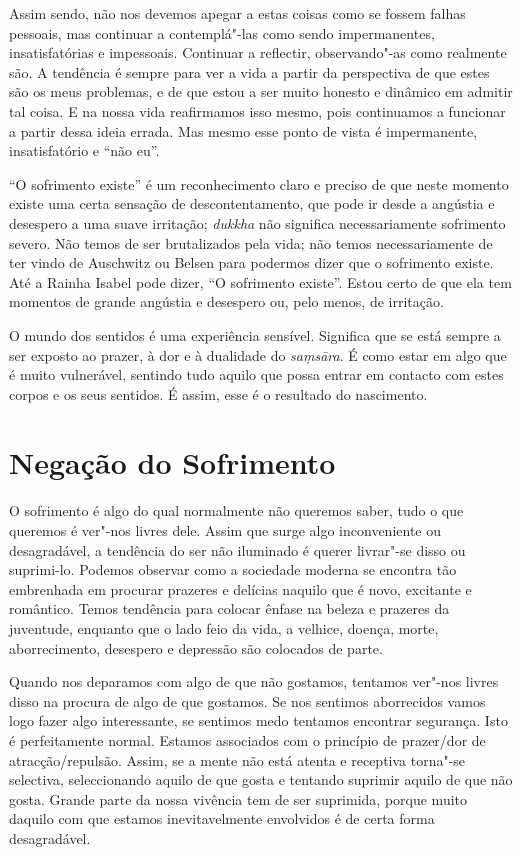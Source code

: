 Assim sendo, não nos devemos apegar a estas coisas como se fossem falhas
pessoais, mas continuar a contemplá"-las como sendo impermanentes,
insatisfatórias e impessoais. Continuar a reflectir, observando"-as como
realmente são. A tendência é sempre para ver a vida a partir da perspectiva de
que estes são os meus problemas, e de que estou a ser muito honesto e dinâmico
em admitir tal coisa. E na nossa vida reafirmamos isso mesmo, pois continuamos a
funcionar a partir dessa ideia errada. Mas mesmo esse ponto de vista é
impermanente, insatisfatório e “não eu”.

“O sofrimento existe” é um reconhecimento claro e preciso de que neste momento
existe uma certa sensação de descontentamento, que pode ir desde a angústia e
desespero a uma suave irritação; \emph{dukkha} não significa necessariamente
sofrimento severo. Não temos de ser brutalizados pela vida; não temos
necessariamente de ter vindo de Auschwitz ou Belsen para podermos dizer que o
sofrimento existe. Até a Rainha Isabel pode dizer, “O sofrimento existe”.
Estou certo de que ela tem momentos de grande angústia e desespero ou, pelo
menos, de irritação.

O mundo dos sentidos é uma experiência sensível. Significa que se está sempre a
ser exposto ao prazer, à dor e à dualidade do \emph{saṃsāra}. É como estar em
algo que é muito vulnerável, sentindo tudo aquilo que possa entrar em contacto
com estes corpos e os seus sentidos. É assim, esse é o resultado do nascimento.

\section{Negação do Sofrimento}

O sofrimento é algo do qual normalmente não queremos saber, tudo o que queremos é
ver"-nos livres dele. Assim que surge algo inconveniente ou desagradável, a
tendência do ser não iluminado é querer livrar"-se disso ou suprimi-lo. Podemos
observar como a sociedade moderna se encontra tão embrenhada em procurar
prazeres e delícias naquilo que é novo, excitante e \mbox{romântico}. Temos tendência para
colocar ênfase na beleza e prazeres da juventude, enquanto que o lado feio da
vida, a velhice, doença, morte, aborrecimento, desespero e depressão são
colocados de parte.

Quando nos deparamos com algo de que não gostamos, tentamos
ver"-nos livres disso na procura de algo de que gostamos. Se nos sentimos
aborrecidos vamos logo fazer algo interessante, se sentimos medo tentamos
encontrar segurança. Isto é perfeitamente normal. Estamos associados com o
princípio de prazer/dor de atracção/repulsão. Assim, se a mente não está atenta
e receptiva torna"-se selectiva, seleccionando aquilo de que gosta e tentando
suprimir aquilo de que não gosta. Grande parte da nossa vivência tem de ser
suprimida, porque muito daquilo com que estamos inevitavelmente envolvidos é de
certa forma desagradável.

